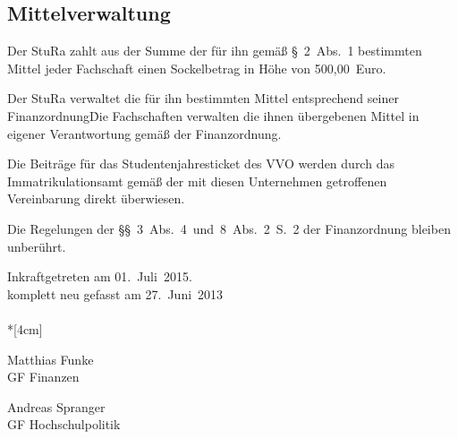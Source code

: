 \begin{multicols}{2}
\section{Mittelverwaltung}

\Abs \Satz  Der StuRa zahlt aus der Summe der für ihn gemäß §~2~Abs.~1 bestimmten Mittel jeder Fachschaft einen Sockelbetrag in Höhe von 500,00~Euro.

\Abs \Satz  Der StuRa verwaltet die für ihn bestimmten Mittel entsprechend seiner Finanzordnung\. Die Fachschaften verwalten die ihnen übergebenen Mittel in eigener Verantwortung gemäß der Finanzordnung.

\Abs \Satz  Die Beiträge für das Studentenjahresticket des VVO werden durch das Immatrikulationsamt gemäß der mit diesen Unternehmen getroffenen Vereinbarung direkt überwiesen.

\Abs \Satz  Die Regelungen der §§~3~Abs.~4~und~8~Abs.~2~S.~2 der Finanzordnung bleiben unberührt.

\end{multicols}

\nopagebreak
\vspace{1cm}
Inkraftgetreten am 01.~Juli~2015.
\\


\footnotesize
komplett neu gefasst am 27.~Juni~2013\\

\normalsize
~\\*[4cm]
\begin{center}
\hspace*{\fill}
\parbox{7cm}{Matthias Funke\\GF Finanzen}
\hfill\parbox{7cm}{Andreas Spranger\\GF Hochschulpolitik}
\hspace*{\fill}
\end{center}

